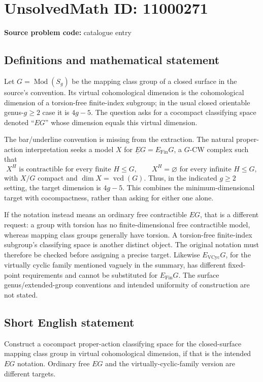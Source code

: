 \documentclass[11pt]{article}
\begin{document}
\section*{UnsolvedMath ID: 11000271}
\textbf{Source problem code:} catalogue entry
\subsection{Definitions and mathematical statement}
Let \(G=\operatorname{Mod}(S_g)\) be the mapping class group of a closed surface in the source's convention. Its virtual cohomological dimension is the cohomological dimension of a torsion-free finite-index subgroup; in the usual closed orientable genus-\(g\geq2\) case it is \(4g-5\). The question asks for a cocompact classifying space denoted ``\(EG\)'' whose dimension equals this virtual dimension.

The bar/underline convention is missing from the extraction. The natural proper-action interpretation seeks a model \(X\) for \(\underline EG=E_{\mathrm{Fin}}G\), a \(G\)-CW complex such that
\[X^H\text{ is contractible for every finite }H\leq G,\qquad
X^H=\varnothing\text{ for every infinite }H\leq G,\]
with \(X/G\) compact and \(\dim X=\operatorname{vcd}(G)\). Thus, in the indicated \(g\geq2\) setting, the target dimension is \(4g-5\). This combines the minimum-dimensional target with cocompactness, rather than asking for either one alone.

If the notation instead means an ordinary free contractible \(EG\), that is a different request: a group with torsion has no finite-dimensional free contractible model, whereas mapping class groups generally have torsion. A torsion-free finite-index subgroup's classifying space is another distinct object. The original notation must therefore be checked before assigning a precise target. Likewise \(E_{\mathrm{VCyc}}G\), for the virtually cyclic family mentioned vaguely in the summary, has different fixed-point requirements and cannot be substituted for \(E_{\mathrm{Fin}}G\). The surface genus/extended-group conventions and intended uniformity of construction are not stated.
\subsection{Short English statement}
Construct a cocompact proper-action classifying space for the closed-surface mapping class group in virtual cohomological dimension, if that is the intended \(EG\) notation. Ordinary free \(EG\) and the virtually-cyclic-family version are different targets.
\end{document}

